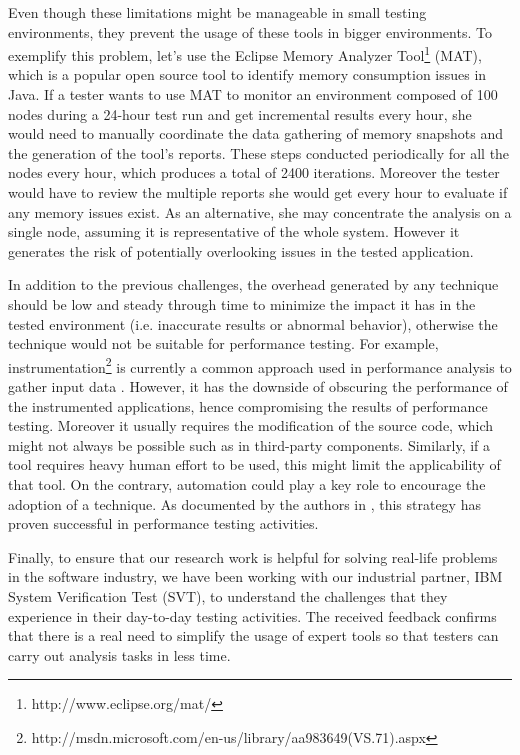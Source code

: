 \documentclass[runningheads,a4paper]{llncs}
\begin{document}
Even though these limitations might be manageable in small testing environments,
they prevent the usage of these tools in bigger environments. To
exemplify this problem, let's use the Eclipse Memory Analyzer
Tool\footnote{http://www.eclipse.org/mat/} (MAT), which is a popular open source
tool to identify memory consumption issues in Java. If a tester wants to use MAT
to monitor an environment composed of 100 nodes during a 24-hour test run and 
get incremental results every hour, she would need to manually coordinate the
data gathering of memory snapshots and the generation of the tool's reports.
These steps conducted periodically for all the nodes every hour, which
produces a total of 2400 iterations. Moreover the tester would have to review
the multiple reports she would get every hour to evaluate if any memory issues
exist. As an alternative, she may concentrate the analysis on a single node,
assuming it is representative of the whole system. However it generates the risk of
potentially overlooking issues in the tested application.

In addition to the previous challenges, the overhead generated by any technique
should be low and steady through time to minimize the impact it has in the
tested environment (i.e. inaccurate results or abnormal behavior), otherwise the technique would
not be suitable for performance testing. For example,
instrumentation\footnote{http://msdn.microsoft.com/en-us/library/aa983649(VS.71).aspx}
is currently a common approach used in performance analysis to gather input data
\cite{Yang1,Hangal1,Csallner1,Chen2}. However, it has the downside of obscuring
the performance of the instrumented applications, hence compromising the results of 
performance testing. Moreover it usually requires the modification of the source
code, which might not always be possible such as in third-party components.
Similarly, if a tool requires heavy human effort to be used, this might limit the 
applicability of that tool. On the contrary, automation could play a key role to encourage 
the adoption of a technique. As documented by the authors in \cite{Shahamiri1},
this strategy has proven successful in performance testing activities.

Finally, to ensure that our research work is helpful for solving real-life
problems in the software industry, we have been working with our industrial
partner, IBM System Verification Test (SVT), to understand the challenges
that they experience in their day-to-day testing activities. The received
feedback confirms that there is a real need to simplify the usage of expert
tools so that testers can carry out analysis tasks in less time.
\end{document}
